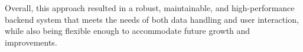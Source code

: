 \documentclass{article}
\begin{document}
Overall, this approach resulted in a robust, maintainable, and high-performance backend system that meets the needs of both data handling and user interaction, while also being flexible enough to accommodate future growth and improvements.








\end{document}
